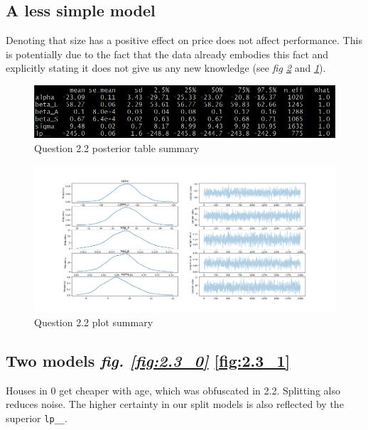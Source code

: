 \documentclass[11pt,a4paper]{article}
\begin{document}
  \subsection{A less simple model}
  Denoting that size has a positive effect on price does not affect performance. This is potentially due to the fact that the data already embodies this fact and explicitly stating it does not give us any new knowledge (see \textit{fig \ref{fig:2.2}} and \textit{\ref{tab:2.2}}).

  \begin{figure}[htb]
    \centering
      \includegraphics[width=\textwidth]{../q22/q22_table_summary.png}
      \caption{Question 2.2 posterior table summary}
    \label{tab:2.2}
  \end{figure}

  \begin{figure}[htb]
    \centering
      \includegraphics[width=\textwidth]{../q22/q22_plot_summary.png}
      \caption{Question 2.2 plot summary}
    \label{fig:2.2}
  \end{figure}

  \subsection{Two models \textit{fig. \ref{fig:2.3_0}} \ref{fig:2.3_1}}
  Houses in 0 get cheaper with age, which was obfuscated in 2.2. Splitting also reduces noise. The higher certainty in our split models is also reflected by the superior \texttt{lp\_\_}.
\end{document}
